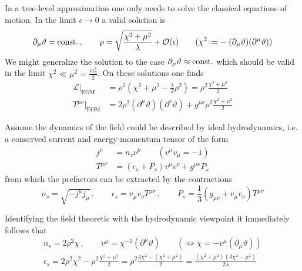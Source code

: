In a tree-level approximation one only needs to solve the classical equations of motion. In the limit $\epsilon\to 0$ a valid solution is
\begin{equation}
    \partial_\mu\vartheta={\text{const.}}\,,\qquad\rho=\sqrt{\frac{\chi^2+\mu^2}{\lambda}}+\mathcal{O}(\epsilon)\qquad(\chi^2{\,\vcentcolon=\,}-(\partial_\mu\vartheta)(\partial^\mu\vartheta))
\end{equation}
We might generalize the solution to the case $\partial_\mu\vartheta\approx{\text{const.}}$ which should be valid in the limit $\chi^2\ll\mu^2=\frac{m_\sigma^2}{2}$. On these solutions one finds
\begin{subequations}
    \begin{align}
        \mathscr{L}\big\vert_{\text{EOM}} & =\rho^2(\chi^2+\mu^2-\frac{\lambda}{2}\rho^2)=\rho^2\frac{\chi^2+\mu^2}{2}                    \\
        T^{\mu\nu}\big\vert_{\text{EOM}}  & =2\rho^2(\partial^\mu\vartheta)(\partial^\nu\vartheta)+g^{\mu\nu}\rho^2\frac{\chi^2+\mu^2}{2}
    \end{align}
\end{subequations}

Assume the dynamics of the field could be described by ideal hydrodynamics, i.e. a conserved current and energy-momentum tensor of the form 
\begin{subequations}
    \begin{align}
        j^\mu      & =n_s\nu^\mu\qquad(v^\mu v_\mu=-1)          \\
        T^{\mu\nu} & =(\epsilon_s+P_s)v^\mu v^\nu+g^{\mu\nu}P_s
    \end{align}
\end{subequations}
from which the prefactors can be extracted by the contractions
\begin{equation}
    n_s=\sqrt{-j^\mu j_\mu}\,,\qquad\epsilon_s=v_\mu v_\nu T^{\mu\nu}\,,\qquad P_s=\frac{1}{3}(g_{\mu\nu}+v_\mu v_\nu)T^{\mu\nu}
\end{equation}

Identifying the field theoretic with the hydrodynamic viewpoint it immediately follows that
\begin{subequations}
    \begin{gather}
        n_s=2\rho^2\chi\,,\qquad v^\mu=\chi^{-1}(\partial^\mu\vartheta)\qquad(\iff\chi=-v^\mu(\partial_\mu\vartheta))\\
        \epsilon_s=2\rho^2\chi^2-\rho^2\frac{\chi^2+\mu^2}{2}=\rho^2\frac{4\chi^2-(\chi^2+\mu^2)}{2}=\frac{(\chi^2+\mu^2)(3\chi^2-\mu^2)}{2\lambda}
    \end{gather}
\end{subequations}

